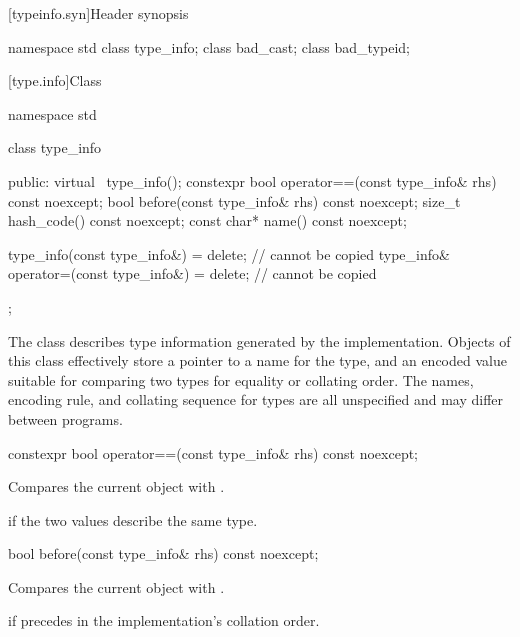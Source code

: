 [typeinfo.syn]{Header  synopsis}

%
%
%
\begin{codeblock}
namespace std {
  class type_info;
  class bad_cast;
  class bad_typeid;
}
\end{codeblock}

[type.info]{Class }

%
\begin{codeblock}
namespace std {
  class type_info {
  public:
    virtual ~type_info();
    constexpr bool operator==(const type_info& rhs) const noexcept;
    bool before(const type_info& rhs) const noexcept;
    size_t hash_code() const noexcept;
    const char* name() const noexcept;

    type_info(const type_info&) = delete;                   // cannot be copied
    type_info& operator=(const type_info&) = delete;        // cannot be copied
  };
}
\end{codeblock}

\pnum
The class
describes type information generated by the implementation.
Objects of this class effectively store a pointer to a name for the type, and
an encoded value suitable for comparing two types for equality or collating order.
The names, encoding rule, and collating sequence for types are all unspecified
%
and may differ between programs.

%
\begin{itemdecl}
constexpr bool operator==(const type_info& rhs) const noexcept;
\end{itemdecl}

\begin{itemdescr}
\pnum
\effects
Compares the current object with .

\pnum
\returns
{}
if the two values describe the same type.
\end{itemdescr}

%
\begin{itemdecl}
bool before(const type_info& rhs) const noexcept;
\end{itemdecl}

\begin{itemdescr}
\pnum
\effects
Compares the current object with .

\pnum
\returns
{}
if
precedes  in the implementation's collation order.
\end{itemdescr}


